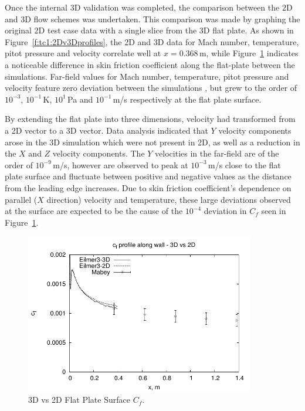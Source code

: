 %
Once the internal 3D validation was completed, the comparison between the 2D and 3D
flow schemes was undertaken. This comparison was made by graphing the original 2D test case data with a single slice from the 3D flat plate. As shown in Figure~\ref{f:tc1:2Dv3Dprofiles}, the 2D and 3D data for Mach number, temperature, pitot pressure and velocity correlate well at $x=0.368$\,m, while Figure~\ref{f:tc1:2Dv3Dcf} indicates a noticeable difference in skin friction coefficient along the flat-plate between the simulations.
Far-field values for Mach number, temperature, pitot pressure and velocity feature zero deviation between the simulations , but grew to the order of $10^{-3}$, $10^{-1}$\,K, $10^1$\,Pa and $10^{-1}$\,m/s respectively at the flat plate surface. 

By extending the flat plate into three dimensions, velocity had transformed from a 2D vector to a 3D vector. Data analysis indicated that $Y$ velocity components arose in the 3D simulation which were not present in 2D, as well as a reduction in the $X$ and $Z$ velocity components.  The $Y$ velocities in the far-field are of the order of $10^{-9}$\,m/s, however are observed to peak at $10^{-3}$\,m/s close to the flat plate surface and fluctuate between positive and negative values as the distance from the leading edge increases. Due to skin friction coefficient's dependence on parallel ($X$ direction) velocity and temperature, these large deviations observed at the surface are expected to be the cause of the $10^{-4}$ deviation in $C_f$ seen in Figure~\ref{f:tc1:2Dv3Dcf}.
%
\begin{figure}[htbp]
 \begin{center}
  \includegraphics[width=10cm]{./chap6-3Dflatplate/figs/2Dto3D/mabey-cf1.pdf}
  \caption{3D vs 2D Flat Plate Surface $C_f$.}
  \label{f:tc1:2Dv3Dcf}
 \end{center}
\end{figure}
%

